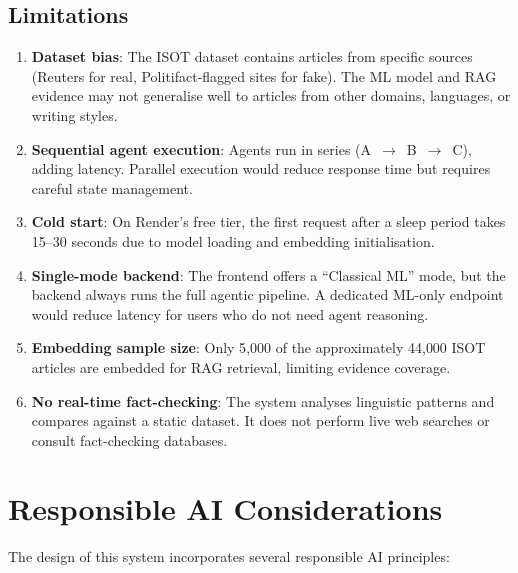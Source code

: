 \documentclass[12pt, a4paper]{article}
\begin{document}
\subsection{Limitations}

\begin{enumerate}[leftmargin=2em]
    \item \textbf{Dataset bias}: The ISOT dataset contains articles from
          specific sources (Reuters for real, Politifact-flagged sites for
          fake). The ML model and RAG evidence may not generalise well to
          articles from other domains, languages, or writing styles.
    \item \textbf{Sequential agent execution}: Agents run in series
          (A~$\to$~B~$\to$~C), adding latency. Parallel execution would
          reduce response time but requires careful state management.
    \item \textbf{Cold start}: On Render's free tier, the first request
          after a sleep period takes 15--30 seconds due to model loading
          and embedding initialisation.
    \item \textbf{Single-mode backend}: The frontend offers a ``Classical
          ML'' mode, but the backend always runs the full agentic pipeline.
          A dedicated ML-only endpoint would reduce latency for users who
          do not need agent reasoning.
    \item \textbf{Embedding sample size}: Only 5{,}000 of the
          approximately 44{,}000 ISOT articles are embedded for RAG
          retrieval, limiting evidence coverage.
    \item \textbf{No real-time fact-checking}: The system analyses
          linguistic patterns and compares against a static dataset. It
          does not perform live web searches or consult fact-checking
          databases.
\end{enumerate}


\section{Responsible AI Considerations}

The design of this system incorporates several responsible AI principles:
\end{document}
